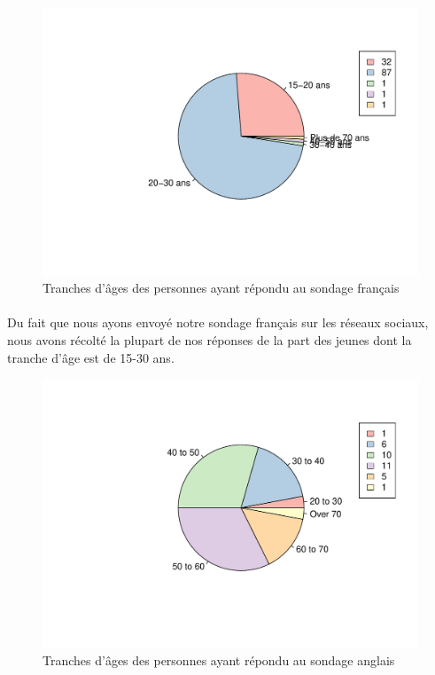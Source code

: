 \documentclass[12pt]{article}\usepackage[]{graphicx}\usepackage[]{color}
\makeatletter
\def\maxwidth{ %
  \ifdim\Gin@nat@width>\linewidth
    \linewidth
  \else
    \Gin@nat@width
  \fi
}
\newenvironment{knitrout}{}{} %
\makeatother
\begin{document}
\begin{knitrout}
\color{fgcolor}\begin{figure}[H]
\includegraphics[width=\maxwidth]{figure/tranche_age_fr-1} \caption[Tranches d'âges des personnes ayant répondu au sondage français]{Tranches d'âges des personnes ayant répondu au sondage français}\label{fig:tranche age fr}
\end{figure}


\end{knitrout}
\paragraph{} Du fait que nous ayons envoyé notre sondage français sur les
réseaux sociaux, nous avons récolté la plupart de nos réponses de la part des
jeunes dont la tranche d'âge est de 15-30 ans.

\begin{knitrout}
\color{fgcolor}\begin{figure}[H]
\includegraphics[width=\maxwidth]{figure/tranche_age_en-1} \caption[Tranches d'âges des personnes ayant répondu au sondage anglais]{Tranches d'âges des personnes ayant répondu au sondage anglais}\label{fig:tranche age en}
\end{figure}


\end{knitrout}
\end{document}
